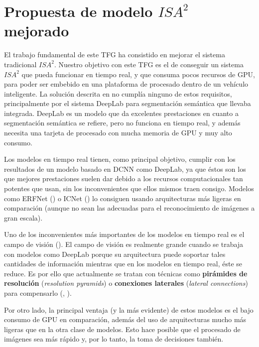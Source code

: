 
\section{Propuesta de modelo $ISA^{2}$ mejorado}
\label{sec:isa2_modelo_nuevo}
El trabajo fundamental de este TFG ha consistido en mejorar el sistema tradicional $ISA^{2}$. Nuestro objetivo con este TFG es el de conseguir un sistema $ISA^{2}$ que pueda funcionar en tiempo real, y que consuma pocos recursos de \ac{GPU}, para poder ser embebido en una plataforma de procesado dentro de un vehículo inteligente. La solución descrita en \cite{isa2} no cumplía ninguno de estos requisitos, principalmente por el sistema DeepLab para segmentación semántica que llevaba integrada. DeepLab es un modelo que da excelentes prestaciones en cuanto a segmentación semántica se refiere, pero no funciona en tiempo real, y además necesita una tarjeta de procesado con mucha memoria de \ac{GPU} y muy alto consumo.

Los modelos en tiempo real tienen, como principal objetivo, cumplir con los resultados de un modelo basado en \ac{DCNN} como DeepLab, ya que éstos son los que mejores prestaciones suelen dar debido a los recursos computacionales tan potentes que usan, sin los inconvenientes que ellos mismos traen consigo. Modelos como ERFNet (\cite{erfnet}) o ICNet (\cite{icnet}) lo consiguen usando arquitecturas más ligeras en comparación (aunque no sean las adecuadas para el reconocimiento de imágenes a gran escala).

Uno de los inconvenientes más importantes de los modelos en tiempo real es el campo de visión (\cite{swiftnet}). El campo de visión es realmente grande cuando se trabaja con modelos como DeepLab porque su arquitectura puede soportar tales cantidades de información mientras que en los modelos en tiempo real, éste se reduce. Es por ello que actualmente se tratan con técnicas como \textbf{pirámides de resolución} (\textit{resolution pyramids}) o \textbf{conexiones laterales} (\textit{lateral connections}) para compensarlo (\cite{res_pyr}, \cite{lat_con}).

Por otro lado, la principal ventaja (y la más evidente) de estos modelos es el bajo consumo de \ac{GPU} en comparación, además del uso de arquitecturas mucho más ligeras que en la otra clase de modelos. Esto hace posible que el procesado de imágenes sea más rápido y, por lo tanto, la toma de decisiones también.


